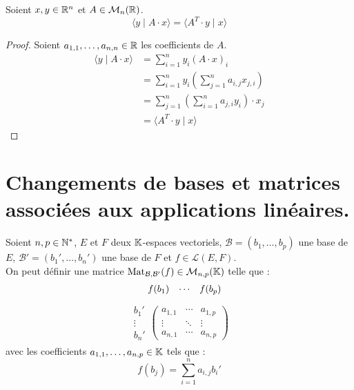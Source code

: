 \begin{lemma}
	Soient $x, y \in \mathbb{R}^n$ et $A \in \mathcal{M}_n(\mathbb{R})$.
	\[ \langle y \mid A \cdot x \rangle = \langle A^T \cdot y \mid x \rangle \]
\end{lemma}

\begin{proof}
	Soient $a_{1,1}, \ldots, a_{n,n} \in \mathbb{R}$ les coefficients de $A$.
	\begin{align*}
		\langle y \mid A \cdot x \rangle &= \sum_{i = 1}^{n} y_i (A \cdot x)_i \\
		&= \sum_{i = 1}^{n} y_i \left( \sum_{j=1}^{n} a_{i,j} x_{j,i} \right) \\
		&= \sum_{j = 1}^{n} \left( \sum_{i = 1}^{n} a_{j,i} y_i \right) \cdot x_j \\
		&= \langle A^T \cdot y \mid x \rangle
	\end{align*}
\end{proof}

\section{Changements de bases et matrices associées aux applications linéaires.}

\begin{definition}
    Soient $n, p \in \mathbb{N}^*$, $E$ et $F$ deux $\mathbb{K}$-espaces vectoriels, $\mathcal{B} = (b_1, \ldots, b_p)$ une base de $E$, $\mathcal{B}' = (b_1', \ldots, b_n')$ une base de $F$ et $f \in \mathcal{L}(E, F)$.
    \\
    On peut définir une matrice $\operatorname{Mat}_{\mathcal{B},\mathcal{B}'} (f) \in \mathcal{M}_{n,p}(\mathbb{K})$ telle que :
    \begin{align*}
        \hspace{0.4cm}
        \begin{matrix}
            f(b_1) & \cdots & f(b_p) 
        \end{matrix}
    \end{align*}
    \begin{align*}
        \begin{matrix}
            b_1' \\
            \vdots \\ 
            b_n'
        \end{matrix}
        \begin{pmatrix}
            a_{1,1} & \cdots & a_{1,p} \\
            \vdots & \ddots & \vdots \\ 
            a_{n,1} & \cdots & a_{n,p}
        \end{pmatrix}
    \end{align*}
    avec les coefficients $a_{1,1}, \ldots, a_{n,p} \in \mathbb{K}$ tels que : 
    \[ f(b_j) = \sum_{i = 1}^n a_{i,j} b_i' \]
\end{definition}

